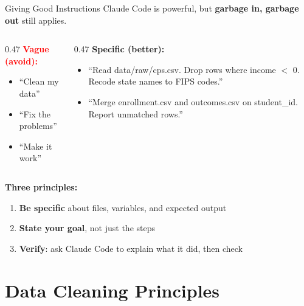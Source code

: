 \begin{frame}{Giving Good Instructions}
  Claude Code is powerful, but \textbf{garbage in, garbage out} still applies.

  \vspace{6pt}

  \begin{columns}[T]
    \begin{column}{0.47\textwidth}
      \textbf{\textcolor{red}{Vague (avoid):}}
      \begin{itemize}
        \item ``Clean my data''
        \item ``Fix the problems''
        \item ``Make it work''
      \end{itemize}
    \end{column}
    \begin{column}{0.47\textwidth}
      \textbf{\textcolor{usfgreen}{Specific (better):}}
      \begin{itemize}
        \item ``Read data/raw/cps.csv. Drop rows where income $<$ 0. Recode state names to FIPS codes.''
        \item ``Merge enrollment.csv and outcomes.csv on student\_id. Report unmatched rows.''
      \end{itemize}
    \end{column}
  \end{columns}

  \vspace{6pt}

  \textbf{Three principles:}
  \begin{enumerate}
    \item \textbf{Be specific} about files, variables, and expected output
    \item \textbf{State your goal}, not just the steps
    \item \textbf{Verify}: ask Claude Code to explain what it did, then check
  \end{enumerate}
\end{frame}


\section{Data Cleaning Principles}

